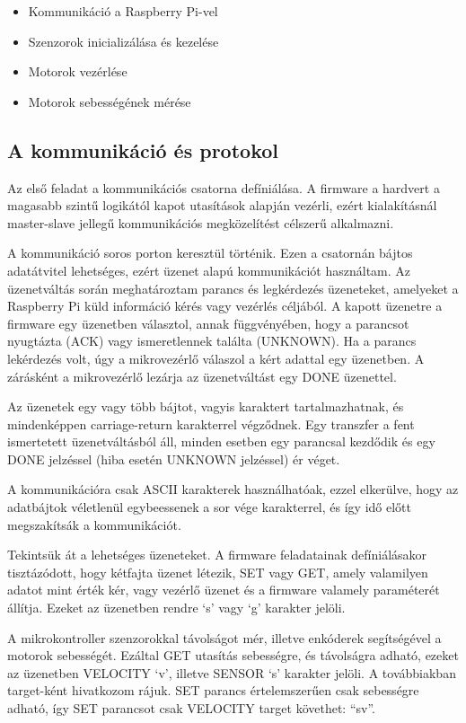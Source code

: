 \begin{itemize}
\item{Kommunikáció a Raspberry Pi-vel}
\item{Szenzorok inicializálása és kezelése}
\item{Motorok vezérlése}
\item{Motorok sebességének mérése}
\end{itemize}

\subsection{A kommunikáció és protokol}

Az első feladat a kommunikációs csatorna defíniálása. A firmware a hardvert a
magasabb szintű logikától kapot utasítások alapján vezérli, ezért kialakításnál
master-slave jellegű kommunikációs megközelítést célszerű alkalmazni.

A kommunikáció soros porton keresztül történik. Ezen a csatornán bájtos
adatátvitel lehetséges, ezért üzenet alapú kommunikációt használtam. Az
üzenetváltás során meghatároztam parancs és legkérdezés üzeneteket, amelyeket a
Raspberry Pi küld információ kérés vagy vezérlés céljából. A kapott üzenetre a
firmware egy üzenetben választol, annak függvényében, hogy a parancsot nyugtázta
(ACK) vagy ismeretlennek találta (UNKNOWN). Ha a parancs lekérdezés volt, úgy a
mikrovezérlő válaszol a kért adattal egy üzenetben. A zárásként a mikrovezérlő
lezárja az üzenetváltást egy DONE üzenettel.

Az üzenetek egy vagy több bájtot, vagyis karaktert tartalmazhatnak, és
mindenképpen carriage-return karakterrel végződnek. Egy transzfer a fent
ismertetett üzenetváltásból áll, minden esetben egy parancsal kezdődik és egy
DONE jelzéssel (hiba esetén UNKNOWN jelzéssel) ér véget.

A kommunikációra csak ASCII karakterek használhatóak, ezzel elkerülve, hogy az
adatbájtok véletlenül egybeessenek a sor vége karakterrel, és így idő előtt
megszakítsák a kommunikációt.


Tekintsük át a lehetséges üzeneteket. A firmware feladatainak defíniálásakor
tisztázódott, hogy kétfajta üzenet létezik, SET vagy GET, amely valamilyen
adatot mint érték kér, vagy vezérlő üzenet és a firmware valamely paraméterét
állítja. Ezeket az üzenetben rendre `s' vagy `g' karakter jelöli.

A mikrokontroller szenzorokkal távolságot mér, illetve enkóderek segítségével a
motorok sebességét. Ezáltal GET utasítás sebességre, és távolságra adható, ezeket
az üzenetben VELOCITY `v', illetve SENSOR `s' karakter jelöli. A továbbiakban
target-ként hivatkozom rájuk. SET parancs
értelemszerűen csak sebességre adható, így SET parancsot csak VELOCITY target
követhet: ``sv''.

